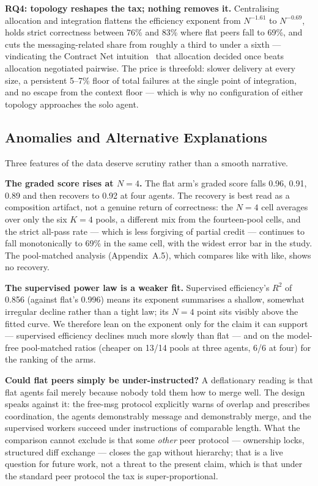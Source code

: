 \documentclass[11pt,a4paper]{article}
\begin{document}
\textbf{RQ4: topology reshapes the tax; nothing removes it.} Centralising allocation and integration flattens the efficiency exponent from $N^{-1.61}$ to $N^{-0.69}$, holds strict correctness between 76\% and 83\% where flat peers fall to 69\%, and cuts the messaging-related share from roughly a third to under a sixth --- vindicating the Contract Net intuition~\cite{smith1980contractnet, davis1983negotiation} that allocation decided once beats allocation negotiated pairwise. The price is threefold: slower delivery at every size, a persistent 5--7\% floor of total failures at the single point of integration, and no escape from the context floor --- which is why no configuration of either topology approaches the solo agent.

\subsection{Anomalies and Alternative Explanations}\label{sec:anomalies}

Three features of the data deserve scrutiny rather than a smooth narrative.

\textbf{The graded score rises at $N = 4$.} The flat arm's graded score falls 0.96, 0.91, 0.89 and then recovers to 0.92 at four agents. The recovery is best read as a composition artifact, not a genuine return of correctness: the $N = 4$ cell averages over only the six $K = 4$ pools, a different mix from the fourteen-pool cells, and the strict all-pass rate --- which is less forgiving of partial credit --- continues to fall monotonically to 69\% in the same cell, with the widest error bar in the study. The pool-matched analysis (Appendix~A.5), which compares like with like, shows no recovery.

\textbf{The supervised power law is a weaker fit.} Supervised efficiency's $R^2$ of 0.856 (against flat's 0.996) means its exponent summarises a shallow, somewhat irregular decline rather than a tight law; its $N = 4$ point sits visibly above the fitted curve. We therefore lean on the exponent only for the claim it can support --- supervised efficiency declines much more slowly than flat --- and on the model-free pool-matched ratios (cheaper on 13/14 pools at three agents, 6/6 at four) for the ranking of the arms.

\textbf{Could flat peers simply be under-instructed?} A deflationary reading is that flat agents fail merely because nobody told them how to merge well. The design speaks against it: the free-msg protocol explicitly warns of overlap and prescribes coordination, the agents demonstrably message and demonstrably merge, and the supervised workers succeed under instructions of comparable length. What the comparison cannot exclude is that some \emph{other} peer protocol --- ownership locks, structured diff exchange --- closes the gap without hierarchy; that is a live question for future work, not a threat to the present claim, which is that under the standard peer protocol the tax is super-proportional.
\end{document}
